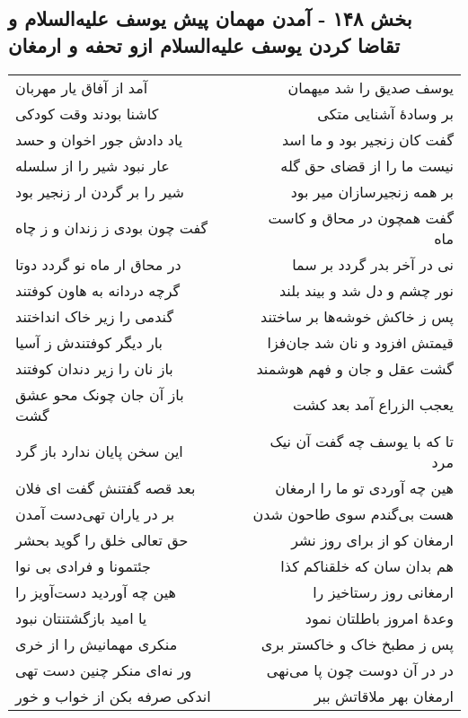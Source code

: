 \begin{center}
\section*{بخش ۱۴۸ - آمدن مهمان پیش یوسف علیه‌السلام و تقاضا کردن یوسف علیه‌السلام ازو تحفه و ارمغان}
\label{sec:sh148}
\begin{longtable}{l p{0.5cm} r}
آمد از آفاق یار مهربان
&&
یوسف صدیق را شد میهمان
\\
کاشنا بودند وقت کودکی
&&
بر وسادهٔ آشنایی متکی
\\
یاد دادش جور اخوان و حسد
&&
گفت کان زنجیر بود و ما اسد
\\
عار نبود شیر را از سلسله
&&
نیست ما را از قضای حق گله
\\
شیر را بر گردن ار زنجیر بود
&&
بر همه زنجیرسازان میر بود
\\
گفت چون بودی ز زندان و ز چاه
&&
گفت همچون در محاق و کاست ماه
\\
در محاق ار ماه نو گردد دوتا
&&
نی در آخر بدر گردد بر سما
\\
گرچه دردانه به هاون کوفتند
&&
نور چشم و دل شد و بیند بلند
\\
گندمی را زیر خاک انداختند
&&
پس ز خاکش خوشه‌ها بر ساختند
\\
بار دیگر کوفتندش ز آسیا
&&
قیمتش افزود و نان شد جان‌فزا
\\
باز نان را زیر دندان کوفتند
&&
گشت عقل و جان و فهم هوشمند
\\
باز آن جان چونک محو عشق گشت
&&
یعجب الزراع آمد بعد کشت
\\
این سخن پایان ندارد باز گرد
&&
تا که با یوسف چه گفت آن نیک مرد
\\
بعد قصه گفتنش گفت ای فلان
&&
هین چه آوردی تو ما را ارمغان
\\
بر در یاران تهی‌دست آمدن
&&
هست بی‌گندم سوی طاحون شدن
\\
حق تعالی خلق را گوید بحشر
&&
ارمغان کو از برای روز نشر
\\
جئتمونا و فرادی بی نوا
&&
هم بدان سان که خلقناکم کذا
\\
هین چه آوردید دست‌آویز را
&&
ارمغانی روز رستاخیز را
\\
یا امید بازگشتنتان نبود
&&
وعدهٔ امروز باطلتان نمود
\\
منکری مهمانیش را از خری
&&
پس ز مطبخ خاک و خاکستر بری
\\
ور نه‌ای منکر چنین دست تهی
&&
در در آن دوست چون پا می‌نهی
\\
اندکی صرفه بکن از خواب و خور
&&
ارمغان بهر ملاقاتش ببر
\\

\end{longtable}
\end{center}
